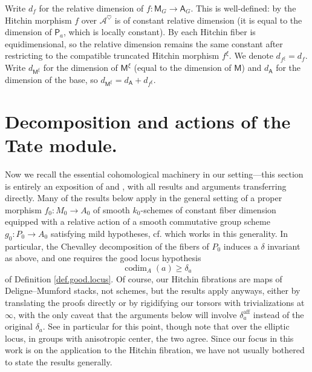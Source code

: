 \documentclass[openany]{amsbook}
\theoremstyle{definition}
\theoremstyle{remark}
\numberwithin{equation}{section}
\newcommand{\cA}{\mathcal{A}}
\renewcommand{\-}{\operatorname{-}}
\newcommand{\on}[1]{\operatorname{#1}}
\newcommand{\bM}{\mathsf{M}}
\newcommand{\bA}{\mathsf{A}}
\newcommand{\bP}{\mathsf{P}}
\newcommand{\aff}{\mathrm{aff}}
\newcommand{\codim}{\on{codim}}
\begin{document}
Write $d_{f}$ for the relative dimension of $f : \bM_G \to \bA_G$. This is well-defined: by \cite[Corollaire 4.16.4]{ngofl} the Hitchin morphism $f$ over $\cA^{\heartsuit}$ is of constant relative dimension (it is equal to the dimension of $\bP_a$, which is locally constant). By \cite[Corollaire 4.16.3]{ngofl} each Hitchin fiber is equidimensional, so the relative dimension remains the same constant after restricting to the compatible truncated Hitchin morphism $f^\xi$. We denote $d_{f^\xi} = d_f$. Write $d_{\bM^\xi}$ for the dimension of $\bM^\xi$ (equal to the dimension of $\bM$) and $d_{\bA}$ for the dimension of the base, so $d_{\bM^\xi} = d_{\bA} + d_{f^\xi}$.

\section{Decomposition and actions of the Tate module.}

Now we recall the essential cohomological machinery in our setting---this section is entirely an exposition of \cite[\S 7]{ngofl} and \cite[\S 10.1-10.3]{CLII}, with all results and arguments transferring directly. Many of the results below apply in the general setting of a proper morphism $f_0 : M_0 \to A_0$ of smooth $k_0$-schemes of constant fiber dimension equipped with a relative action of a smooth commutative group scheme $g_0 : P_0 \to A_0$ satisfying mild hypotheses, cf. \cite[\S 7]{ngofl} which works in this generality. In particular, the Chevalley decomposition of the fibers of $P_0$ induces a $\delta$ invariant as above, and one requires the good locus hypothesis
$$
    \codim_A(a) \ge \delta_a
$$
of Definition \ref{def.good.locus}. Of course, our Hitchin fibrations are maps of Deligne--Mumford stacks, not schemes, but the results apply anyways, either by translating the proofs directly or by rigidifying our torsors with trivializations at $\infty$, with the only caveat that the arguments below will involve $\delta_a^{\aff}$ instead of the original $\delta_a$. See in particular \cite[4.5.6, 4.12]{ngofl} for this point, though note that over the elliptic locus, in groups with anisotropic center, the two agree. Since our focus in this work is on the application to the Hitchin fibration, we have not usually bothered to state the results generally.
\end{document}
